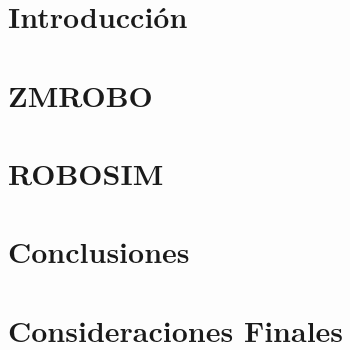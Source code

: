 \documentclass{extbook}
\begin{document}

\tableofcontents
\listoffigures
\listoftables
\chapter{Introducción}

\chapter{ZMROBO}

\chapter{ROBOSIM}

\chapter{Conclusiones}

\chapter{Consideraciones Finales}


\end{document}
